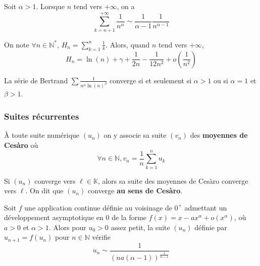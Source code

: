 
  \begin{lemma}
    Soit $\alpha > 1$. Lorsque $n$ tend vers $+\infty$, on a
    \[ \sum_{k=n+1}^{+\infty} \frac{1}{n^\alpha} \sim \frac{1}{\alpha - 1} \frac{1}{n^{\alpha - 1}} \]
  \end{lemma}


  \begin{proposition}
    On note $\forall n \in \mathbb{N}^*, \, H_n = \sum_{k=1}^{n} \frac{1}{k}$. Alors, quand $n$ tend vers $+\infty$,
    \[ H_n = \ln(n) + \gamma + \frac{1}{2n} - \frac{1}{12n^2} + o\left( \frac{1}{n^2} \right) \]
  \end{proposition}


  \begin{application}
    La série de Bertrand $\sum \frac{1}{n^\alpha \ln(n)^\beta}$ converge si et seulement si $\alpha > 1$ ou si $\alpha = 1$ et $\beta > 1$.
  \end{application}

  \subsubsection{Suites récurrentes}


  \begin{definition}
    À toute suite numérique $(u_n)$ on y associe sa suite $(v_n)$ des \textbf{moyennes de Cesàro} où
    \[ \forall n \in \mathbb{N}, v_n = \frac{1}{n} \sum_{k=1}^{n} u_k \]
  \end{definition}

  \begin{theorem}
    Si $(u_n)$ converge vers $\ell \in \mathbb{K}$, alors sa suite des moyennes de Cesàro converge vers $\ell$. On dit que $(u_n)$ converge \textbf{au sens de Cesàro}.
  \end{theorem}


  \begin{proposition}
    Soit $f$ une application continue définie au voisinage de $0^+$ admettant
    un développement asymptotique en $0$ de la forme $f(x) = x - ax^\alpha + o(x^\alpha)$, où $a > 0$ et $\alpha > 1$. Alors pour $u_0 > 0$ assez petit, la suite $(u_n)$ définie par $u_{n+1} = f(u_n)$ pour $n \in \mathbb{N}$ vérifie
    \[ u_n \sim \frac{1}{(na(\alpha-1))^{\frac{1}{\alpha-1}}} \]
  \end{proposition}

